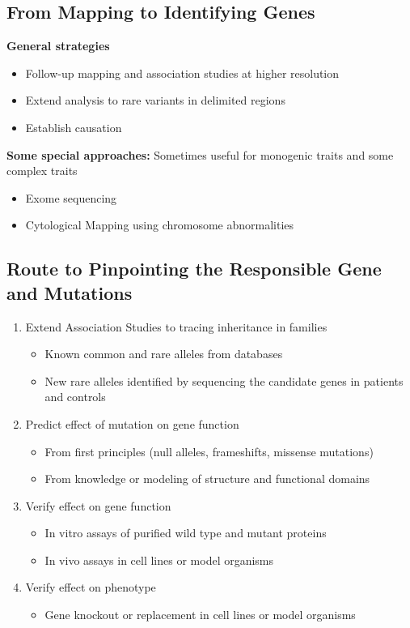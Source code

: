 \documentclass[10pt]{article}
\begin{document}
\subsection*{From Mapping to Identifying Genes}
\textbf{General strategies}
\begin{itemize}
	\item Follow-up mapping and association studies at higher resolution
	\item Extend analysis to rare variants in delimited regions
	\item Establish causation
\end{itemize}
\textbf{Some special approaches:} Sometimes useful for monogenic traits and some complex traits
\begin{itemize}
	\item Exome sequencing
	\item Cytological Mapping using chromosome abnormalities
\end{itemize}

\subsection*{Route to Pinpointing the Responsible Gene and Mutations}
\begin{enumerate}
    \item Extend Association Studies to tracing inheritance in families
    \begin{itemize}
        \item Known common and rare alleles from databases
        \item New rare alleles identified by sequencing the candidate genes in patients and controls
    \end{itemize}
    \item Predict effect of mutation on gene function
    \begin{itemize}
        \item From first principles (null alleles, frameshifts, missense mutations)
        \item From knowledge or modeling of structure and functional domains
    \end{itemize}
    \item Verify effect on gene function
    \begin{itemize}
        \item In vitro assays of purified wild type and mutant proteins
        \item In vivo assays in cell lines or model organisms
    \end{itemize}
    \item Verify effect on phenotype
    \begin{itemize}
        \item Gene knockout or replacement in cell lines or model organisms
    \end{itemize}
\end{enumerate}
\end{document}
